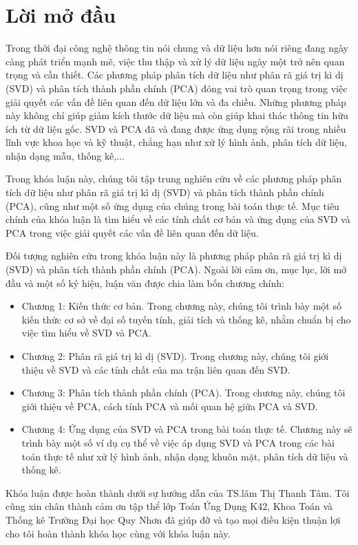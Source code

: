 \documentclass[12pt,a4paper,oneside]{report}
\numberwithin{equation}{section}
\begin{document}
\chapter*{Lời mở đầu}

\begin{justify}   
Trong thời đại công nghệ thông tin nói chung và dữ liệu hơn nói riêng đang ngày càng phát triển mạnh mẽ, việc thu thập và xử lý dữ liệu ngày một trở nên quan trọng và cần thiết. Các phương pháp phân tích dữ liệu như phân rã giá trị kì dị (SVD) và phân tích thành phần chính (PCA) đóng vai trò quan trọng trong việc giải quyết các vấn đề liên quan đến dữ liệu lớn và đa chiều. Những phương pháp này không chỉ giúp giảm kích thước dữ liệu mà còn giúp khai thác thông tin hữu ích từ dữ liệu gốc. SVD và PCA đã và đang được ứng dụng rộng rãi trong nhiều lĩnh vực khoa học và kỹ thuật, chẳng hạn như xử lý hình ảnh, phân tích dữ liệu, nhận dạng mẫu, thống kê,...

Trong khóa luận này, chúng tôi tập trung nghiên cứu về các phương pháp phân tích dữ liệu như phân rã giá trị kì dị (SVD) và phân tích thành phần chính (PCA), cũng như một số ứng dụng của chúng trong bài toán thực tế. Mục tiêu chính của khóa luận là tìm hiểu về các tính chất cơ bản và ứng dụng của SVD và PCA trong việc giải quyết các vấn đề liên quan đến dữ liệu.

Đối tượng nghiên cứu trong khóa luận này là phương pháp phân rã giá trị kì dị (SVD) và phân tích thành phần chính (PCA). Ngoài lời cảm ơn, mục lục, lời mở đầu và một số ký hiệu, luận văn được chia làm bốn chương chính:
\begin{itemize}
\item Chương 1: Kiến thức cơ bản. Trong chương này, chúng tôi trình bày một số kiến thức cơ sở về đại số tuyến tính, giải tích và thống kê, nhằm chuẩn bị cho việc tìm hiểu về SVD và PCA.

\item Chương 2: Phân rã giá trị kì dị (SVD). Trong chương này, chúng tôi giới thiệu về SVD và các tính chất của ma trận liên quan đến SVD.

\item Chương 3: Phân tích thành phần chính (PCA). Trong chương này, chúng tôi giới thiệu về PCA, cách tính PCA và mối quan hệ giữa PCA và SVD.

\item Chương 4: Ứng dụng của SVD và PCA trong bài toán thực tế. Chương này sẽ trình bày một số ví dụ cụ thể về việc áp dụng SVD và PCA trong các bài toán thực tế như xử lý hình ảnh, nhận dạng khuôn mặt, phân tích dữ liệu và thống kê.
\end{itemize}
Khóa luận được hoàn thành dưới sự hướng dẫn của TS.lâm Thị Thanh Tâm. Tôi cũng xin chân thành cảm ơn tập thể lớp Toán Ứng Dụng K42, Khoa Toán và Thống kê Trường Đại học Quy Nhơn đã giúp đỡ và tạo mọi điều kiện thuận lợi cho tôi hoàn thành khóa học cùng với khóa luận này.


\end{justify}
\end{document}
